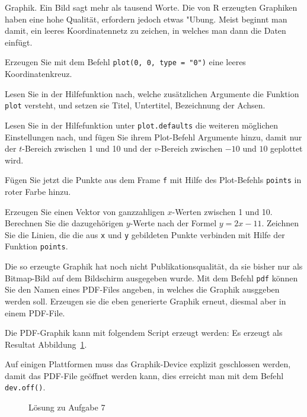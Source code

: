 Graphik. Ein Bild sagt mehr als tausend Worte. Die von R erzeugten
Graphiken haben eine hohe Qualität, erfordern jedoch etwas "Ubung.
Meist beginnt man damit, ein leeres Koordinatennetz zu zeichen, in welches
man dann die Daten einfügt.
\begin{teilaufgaben}
\item Erzeugen Sie mit dem Befehl \verb+plot(0, 0, type = "0")+ eine
leeres Koordinatenkreuz.
\item Lesen Sie in der Hilfefunktion nach, welche zusätzlichen
Argumente die Funktion {\tt plot} versteht, und setzen sie Titel,
Untertitel, Bezeichnung der Achsen.
\item Lesen Sie in der Hilfefunktion unter {\tt plot.defaults} die
weiteren möglichen Einstellungen nach, und fügen Sie ihrem Plot-Befehl
Argumente hinzu, damit nur der $t$-Bereich zwischen 1 und 10 und der
$v$-Bereich zwischen $-10$ und $10$ geplottet wird.
\item Fügen Sie jetzt die Punkte aus dem Frame {\tt f} mit Hilfe des
Plot-Befehls {\tt points} in roter Farbe hinzu.
\item Erzeugen Sie einen Vektor von ganzzahligen $x$-Werten zwischen 1
und 10. Berechnen Sie die dazugehörigen $y$-Werte nach der Formel $y=2x-11$.
Zeichnen Sie die Linien, die die aus {\tt x} und {\tt y} gebildeten
Punkte verbinden mit Hilfe der Funktion {\tt points}.
\item Die so erzeugte Graphik hat noch nicht Publikationsqualität, da
sie bisher nur als Bitmap-Bild auf dem Bildschirm ausgegeben wurde.
Mit dem Befehl {\tt pdf} können Sie den Namen eines PDF-Files angeben,
in welches die Graphik ausggeben werden soll. Erzeugen sie die eben
generierte Graphik erneut, diesmal aber in einem PDF-File.
\end{teilaufgaben}


\begin{loesung}
Die PDF-Graphik kann mit folgendem Script erzeugt werden:
Es erzeugt als Resultat Abbildung~\ref{r0000007:aufg7}.

Auf einigen Plattformen muss das Graphik-Device explizit geschlossen
werden, damit das PDF-File geöffnet werden kann, dies erreicht man
mit dem Befehl {\tt dev.off()}.
\begin{figure}
\begin{center}
\end{center}
\caption{Lösung zu Aufgabe 7\label{r0000007:aufg7}}
\end{figure}
\end{loesung}

